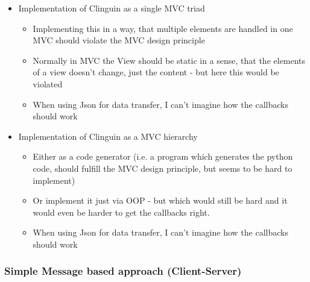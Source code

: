 \documentclass[12pt,a4paper]{article}
\newcommand{\<}[1]{\guilsinglleft}
\renewcommand{\>}[1]{\guilsinglright}
\begin{document}
\begin{itemize}
    \item Implementation of Clinguin as a single MVC triad
    \begin{itemize}
        \item Implementing this in a way, that multiple elements are handled in one MVC should violate the MVC design principle
        \item Normally in MVC the View should be static in a sense, that the elements of a view doesn't change, just the content - but here this would be violated
        \item When using Json for data transfer, I can't imagine how the callbacks should work
    \end{itemize}
    \item Implementation of Clinguin as a MVC hierarchy
    \begin{itemize}
        \item Either as a code generator (i.e. a program which generates the python code, should fulfill the MVC design principle, but seems to be hard to implement)
        \item Or implement it just via OOP - but which would still be hard and it would even be harder to get the callbacks right.
        \item When using Json for data transfer, I can't imagine how the callbacks should work
    \end{itemize}
\end{itemize}


\subsubsection{Simple Message based approach (Client-Server)}
\label{subsubsec:client-server}
\end{document}
